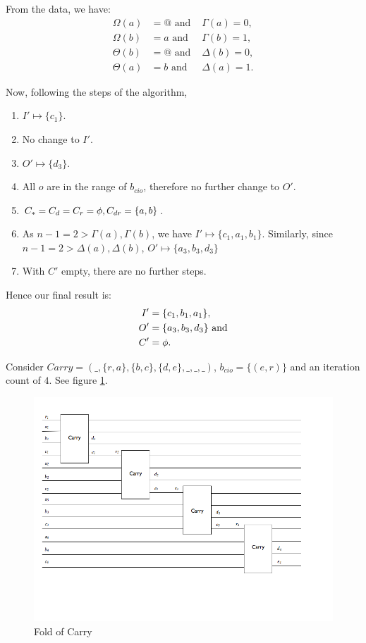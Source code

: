 From the data, we have:
\begin{align*}
  \Omega(a) &= @\text{ and }&\Gamma(a)=0,\\
  \Omega(b) &= a\text{ and }&\Gamma(b) = 1,\\
  \Theta(b)&=@\text{ and }&\Delta(b)=0,\\
  \Theta(a)&=b\text{ and }&\Delta(a)=1.
\end{align*}

Now, following the steps of the algorithm,
\begin{enumerate}
  \item $I' \mapsto \{c_1\}$.
  \item No change to $I'$.
  \item $O' \mapsto \{d_3\}$.
  \item All $o$ are in the range of $b_{cio}$, therefore no further
    change to $O'$.
  \item $C_*=C_d=C_r = \phi, C_{dr}=\{a,b\}$.
  \item As $n-1=2 > \Gamma(a),\Gamma(b)$, we have $I'
    \mapsto \{c_1,a_1,b_1\}$. Similarly, since $n-1=2 > \Delta(a),\Delta(b)$,
    $O'\mapsto \{a_3,b_3,d_3\}$
  \item With $C'$ empty, there are no further steps.
\end{enumerate}
Hence our final result is:
\begin{align*}
  I'&=\{c_1,b_1,a_1\},\\
  O'&=\{a_3,b_3,d_3\}\text{ and}\\
  C'&=\phi.
\end{align*}

\begin{example}\label{exmpl:fold_transform_example_of_carry}
  Consider $Carry=(\_,\{r,a\},\{b,c\},\{d,e\},\_,\_,\_)$,
  $b_{cio}=\{(e,r)\}$ and an iteration count of $4$. See figure
  \ref{fig:fold_carry_transformed}.
\end{example}
\begin{figure}[htbp]
  \centering
    \includegraphics[scale=.5]{diagrams/FoldCarryTransformed.png}
  \caption{Fold of Carry}
  \label{fig:fold_carry_transformed}
\end{figure}

